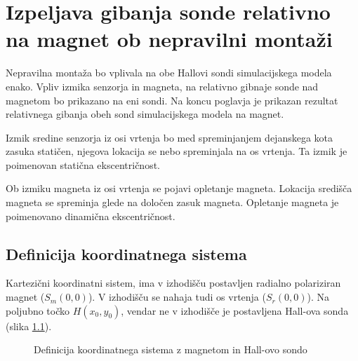 \chapter{Izpeljava gibanja sonde relativno na magnet ob nepravilni montaži}

Nepravilna montaža bo vplivala na obe Hallovi sondi simulacijskega modela enako. Vpliv izmika senzorja in magneta, na relativno gibnaje sonde nad magnetom bo prikazano na eni sondi. Na koncu poglavja je prikazan rezultat relativnega gibanja obeh sond simulacijskega modela na magnet.

Izmik sredine senzorja iz osi vrtenja bo med spreminjanjem dejanskega kota zasuka statičen, njegova lokacija se nebo spreminjala na os vrtenja. Ta izmik je poimenovan statična ekscentričnost.

Ob izmiku magneta iz osi vrtenja se pojavi opletanje magneta. Lokacija središča magneta se spreminja glede na določen zasuk magneta. Opletanje magneta je poimenovano dinamična ekscentričnost.


\section{Definicija koordinatnega sistema}

Kartezični koordinatni sistem, ima v izhodišču postavljen radialno polariziran magnet ($S_m(0, 0)$). V izhodišču se nahaja tudi os vrtenja ($S_r(0, 0)$). Na poljubno točko $H(x_0,y_0)$, vendar ne v izhodišče je postavljena Hall-ova sonda (slika \ref{fig:def_kks}).
\begin{figure}[h!]
	\centering
	\caption{Definicija koordinatnega sistema z magnetom in Hall-ovo sondo}
	\label{fig:def_kks}
\end{figure}

